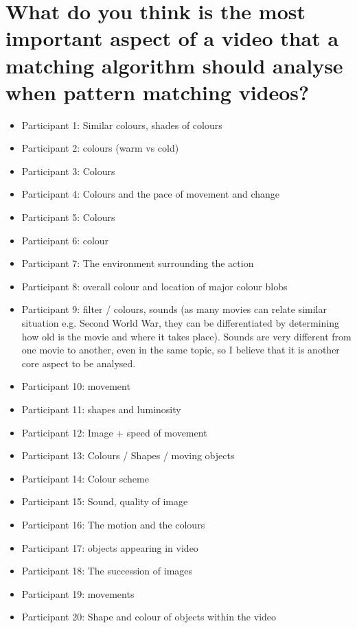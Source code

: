 \section{What do you think is the most important aspect of a video that a matching algorithm should analyse when pattern matching videos?}

\begin{itemize}
	\item Participant 1: Similar colours, shades of colours
    \item Participant 2: colours (warm vs cold) 
    \item Participant 3: Colours 
    \item Participant 4: Colours and the pace of movement and change
    \item Participant 5: Colours
    \item Participant 6: colour
    \item Participant 7: The environment surrounding the action
    \item Participant 8: overall colour and location of major colour blobs
    \item Participant 9: filter / colours, sounds (as many movies can relate similar situation e.g. Second World War, they can be differentiated by determining how old is the movie and where it takes place). Sounds are very different from one movie to another, even in the same topic, so I believe that it is another core aspect to be analysed.
    \item Participant 10: movement 
    \item Participant 11: shapes and luminosity 
    \item Participant 12: Image + speed of movement 
    \item Participant 13: Colours / Shapes / moving objects
    \item Participant 14: Colour scheme
    \item Participant 15: Sound, quality of image
    \item Participant 16: The motion and the colours
    \item Participant 17: objects appearing in video
    \item Participant 18: The succession of images
    \item Participant 19: movements
    \item Participant 20: Shape and colour of objects within the video
\end{itemize}

